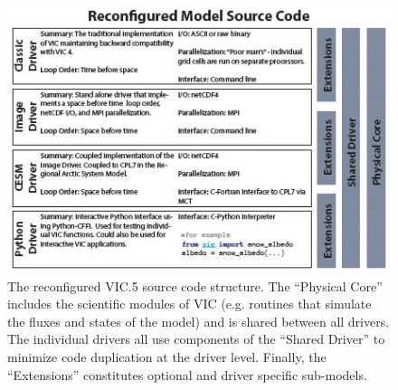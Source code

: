 \documentclass[gmd, manuscript]{copernicus}
\begin{document}









\clearpage
\begin{figure}[t]
\includegraphics[width=6in]{VIC_config.jpg}
\caption{The reconfigured VIC.5 source code structure. The ``Physical Core'' includes the scientific modules of VIC (e.g. routines that simulate the fluxes and states of the model) and is shared between all drivers. The individual drivers all use components of the ``Shared Driver'' to minimize code duplication at the driver level. Finally, the ``Extensions'' constitutes optional and driver specific sub-models.}
\label{fig:vic_config}
\end{figure}
\end{document}
